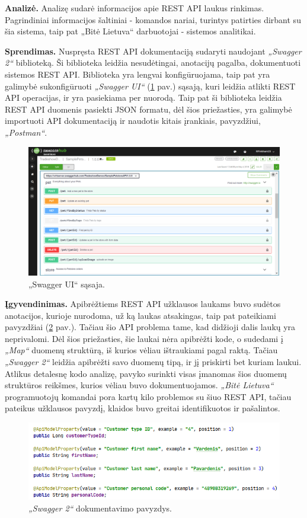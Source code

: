 \textbf{Analizė.}
Analizę sudarė informacijos apie REST API laukus rinkimas. Pagrindiniai informacijos šaltiniai - komandos nariai, turintys patirties dirbant su šia sistema,
taip pat „Bitė Lietuva“ darbuotojai - sistemos analitikai.

\textbf{Sprendimas.}
Nuspręsta REST API dokumentaciją sudaryti naudojant \textit{„Swagger 2“} biblioteką. Ši biblioteka leidžia nesudėtingai, anotacijų pagalba, dokumentuoti sistemos REST API.
Biblioteka yra lengvai konfigūruojama, taip pat yra galimybė sukonfigūruoti \textit{„Swagger UI“} (\ref{img:swagger} pav.\footnotemark[1]) sąsają,
kuri leidžia atlikti REST API operacijas, ir yra pasiekiama  per nuorodą. Taip pat ši biblioteka leidžia REST API duomenis pasiekti JSON formatu, dėl šios priežasties,
yra galimybė importuoti API dokumentaciją ir naudotis kitais įrankiais, pavyzdžiui, \textit{„Postman“}.


\begin{figure}[H]
    \centering
    \includegraphics[scale=0.25]{img/swagger.png}
    \caption{„Swagger UI“ sąsaja.}
    \label{img:swagger}
\end{figure}

\textbf{Įgyvendinimas.}
Apibrėžtiems REST API užklausos laukams buvo sudėtos anotacijos, kurioje nurodoma, už ką laukas atsakingas, taip pat pateikiami pavyzdžiai (\ref{img:customer-dto} pav.).
Tačiau šio API problema tame, kad didžioji dalis laukų yra neprivalomi. Dėl šios priežasties, šie laukai nėra apibrėžti kode, o sudedami į \textit{„Map“} duomenų struktūrą, iš kurios
vėliau ištraukiami pagal raktą. Tačiau \textit{„Swagger 2“} leidžia apibrėžti savo duomenų tipą, ir jį priskirti bet kuriam laukui. Atlikus detalesnę kodo analizę, pavyko surinkti
visas įmanomas šios duomenų struktūros reikšmes, kurios vėliau buvo dokumentuojamos.
\textit{„Bitė Lietuva“} programuotojų komandai pora kartų kilo problemos su šiuo REST API, tačiau pateikus užklausos pavyzdį, klaidos buvo greitai identifikuotos ir pašalintos.


\begin{figure}[H]
    \centering
    \includegraphics[scale=0.5]{img/customer-dto.png}
    \caption{\textit{„Swagger 2“} dokumentavimo pavyzdys.}
    \label{img:customer-dto}
\end{figure}
